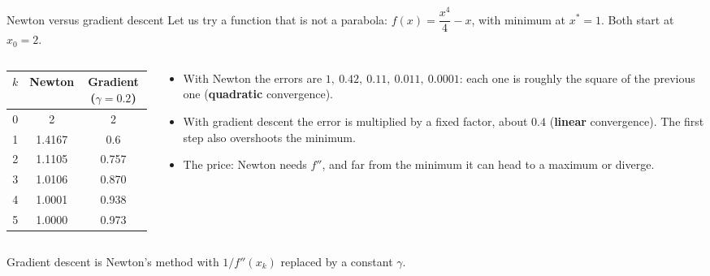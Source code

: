 \documentclass[aspectratio=169,10pt]{beamer}
\begin{document}
\begin{frame}{Newton versus gradient descent}
  Let us try a function that is not a parabola: $f(x)=\dfrac{x^4}{4}-x$, with minimum at $x^*=1$. Both start at $x_0 = 2$.
  \medskip

  \begin{columns}[T]
    \begin{column}{0.4\textwidth}
      \centering\small
      \begin{tabular}{ccc}
        \toprule
        $k$ & Newton & Gradient ($\gamma=0.2$) \\
        \midrule
        0 & 2      & 2 \\
        1 & 1.4167 & 0.6 \\
        2 & 1.1105 & 0.757 \\
        3 & 1.0106 & 0.870 \\
        4 & 1.0001 & 0.938 \\
        5 & 1.0000 & 0.973 \\
        \bottomrule
      \end{tabular}
    \end{column}
    \begin{column}{0.56\textwidth}
      \begin{itemize}
        \item With Newton the errors are $1,\ 0.42,\ 0.11,\ 0.011,\ 0.0001$: each one is roughly the square of the previous one (\textbf{quadratic} convergence).
        \item With gradient descent the error is multiplied by a fixed factor, about $0.4$ (\textbf{linear} convergence). The first step also overshoots the minimum.
        \item The price: Newton needs $f''$, and far from the minimum it can head to a maximum or diverge.
      \end{itemize}
    \end{column}
  \end{columns}
  \medskip

  \begin{ecuacion}
    Gradient descent is Newton's method with $1/f''(x_k)$ replaced by a constant $\gamma$.
  \end{ecuacion}
\end{frame}

\end{document}
